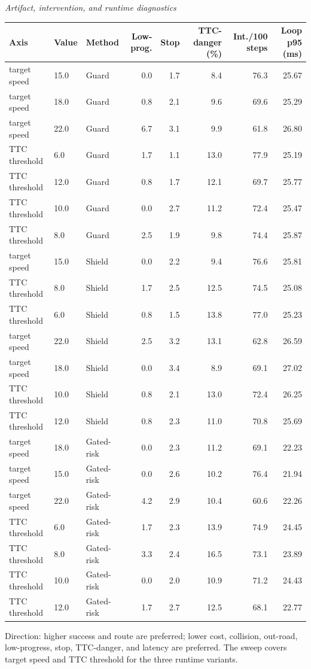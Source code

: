 \begin{table}[!htbp]
\begin{tabular}{@{}llrrrrrr@{}}
\bottomrule
\end{tabular}
\vspace{3pt}
\textit{Artifact, intervention, and runtime diagnostics}\par
\begin{tabular}{@{}lllrrrrr@{}}
\toprule
Axis & Value & Method & Low-prog. & Stop & TTC-danger (\%) & Int./100 steps & Loop p95 (ms) \\
\midrule
target speed & 15.0 & Guard & 0.0 & 1.7 & 8.4 & 76.3 & 25.67 \\
target speed & 18.0 & Guard & 0.8 & 2.1 & 9.6 & 69.6 & 25.29 \\
target speed & 22.0 & Guard & 6.7 & 3.1 & 9.9 & 61.8 & 26.80 \\
TTC threshold & 6.0 & Guard & 1.7 & 1.1 & 13.0 & 77.9 & 25.19 \\
TTC threshold & 12.0 & Guard & 0.8 & 1.7 & 12.1 & 69.7 & 25.77 \\
TTC threshold & 10.0 & Guard & 0.0 & 2.7 & 11.2 & 72.4 & 25.47 \\
TTC threshold & 8.0 & Guard & 2.5 & 1.9 & 9.8 & 74.4 & 25.87 \\
target speed & 15.0 & Shield & 0.0 & 2.2 & 9.4 & 76.6 & 25.81 \\
TTC threshold & 8.0 & Shield & 1.7 & 2.5 & 12.5 & 74.5 & 25.08 \\
TTC threshold & 6.0 & Shield & 0.8 & 1.5 & 13.8 & 77.0 & 25.23 \\
target speed & 22.0 & Shield & 2.5 & 3.2 & 13.1 & 62.8 & 26.59 \\
target speed & 18.0 & Shield & 0.0 & 3.4 & 8.9 & 69.1 & 27.02 \\
TTC threshold & 10.0 & Shield & 0.8 & 2.1 & 13.0 & 72.4 & 26.25 \\
TTC threshold & 12.0 & Shield & 0.8 & 2.3 & 11.0 & 70.8 & 25.69 \\
target speed & 18.0 & Gated-risk & 0.0 & 2.3 & 11.2 & 69.1 & 22.23 \\
target speed & 15.0 & Gated-risk & 0.0 & 2.6 & 10.2 & 76.4 & 21.94 \\
target speed & 22.0 & Gated-risk & 4.2 & 2.9 & 10.4 & 60.6 & 22.26 \\
TTC threshold & 6.0 & Gated-risk & 1.7 & 2.3 & 13.9 & 74.9 & 24.45 \\
TTC threshold & 8.0 & Gated-risk & 3.3 & 2.4 & 16.5 & 73.1 & 23.89 \\
TTC threshold & 10.0 & Gated-risk & 0.0 & 2.0 & 10.9 & 71.2 & 24.43 \\
TTC threshold & 12.0 & Gated-risk & 1.7 & 2.7 & 12.5 & 68.1 & 22.77 \\
\bottomrule
\end{tabular}
\begin{tablenotes}
\item Direction: higher success and route are preferred; lower cost, collision, out-road, low-progress, stop, TTC-danger, and latency are preferred. The sweep covers target speed and TTC threshold for the three runtime variants.
\end{tablenotes}
\end{table}

